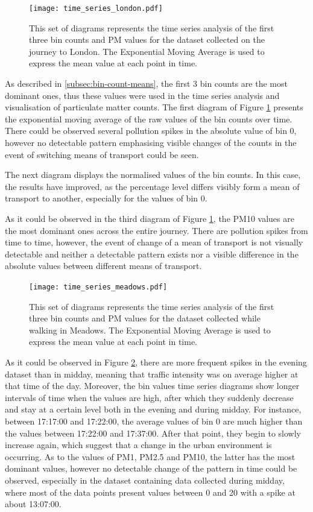 \documentclass[bsc,frontabs,twoside,singlespacing, parskip,deptreport]{infthesis}     %
\begin{document}
\begin{figure}[h!]
  \center
  \texttt{[image: time\_series\_london.pdf]} 
  \caption{This set of diagrams represents the time series analysis of the first three bin counts and PM values for the dataset collected on the journey to London. The Exponential Moving Average is used to express the mean value at each point in time.}
  \label{fig:time_series_london}
\end{figure}

As described in \ref{subsec:bin-count-means}, the first 3 bin counts are the most dominant ones, thus these values were used in the time series analysis and visualisation of particulate matter counts. The first diagram of Figure \ref{fig:time_series_london} presents the exponential moving average of the raw values of the bin counts over time. There could be observed several pollution spikes in the absolute value of bin 0, however no detectable pattern emphasising visible changes of the counts in the event of switching means of transport could be seen.

The next diagram displays the normalised values of the bin counts. In this case, the results have improved, as the percentage level differs visibly form a mean of transport to another, especially for the values of bin 0.

As it could be observed in the third diagram of Figure \ref{fig:time_series_london}, the PM10 values are the most dominant ones across the entire journey. There are pollution spikes from time to time, however, the event of change of a mean of transport is not visually detectable and neither a detectable pattern exists nor a visible difference in the absolute values between different means of transport.

\begin{figure}[h!]
  \center
  \texttt{[image: time\_series\_meadows.pdf]} 
  \caption{This set of diagrams represents the time series analysis of the first three bin counts and PM values for the dataset collected while walking in Meadows. The Exponential Moving Average is used to express the mean value at each point in time.}
  \label{fig:time_series_meadows}
\end{figure}

As it could be observed in Figure \ref{fig:time_series_meadows}, there are more frequent spikes in the evening dataset than in midday, meaning that traffic intensity was on average higher at that time of the day. Moreover, the bin values time series diagrams show longer intervals of time when the values are high, after which they suddenly decrease and stay at a certain level both in the evening and during midday. For instance, between 17:17:00 and 17:22:00, the average values of bin 0 are much higher than the values between 17:22:00 and 17:37:00. After that point, they begin to slowly increase again, which suggest that a change in the urban environment is occurring. As to the values of PM1, PM2.5 and PM10, the latter has the most dominant values, however no detectable change of the pattern in time could be observed, especially in the dataset containing data collected during midday, where most of the data points present values between 0 and 20 with a spike at about 13:07:00.
\end{document}

